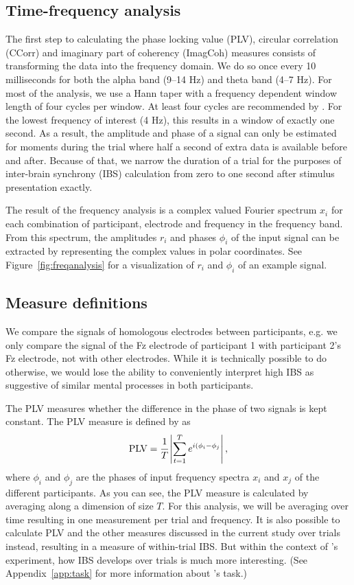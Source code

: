 \subsection{Time-frequency analysis}
The first step to calculating the phase locking value (PLV), circular
correlation (CCorr) and imaginary part of coherency (ImagCoh) measures consists
of transforming the data into the frequency domain. We do so once every 10
milliseconds for both the alpha band (9--14 Hz) and theta band (4--7 Hz). For
most of the analysis, we use a Hann taper with a frequency dependent window
length of four cycles per window. At least four cycles are recommended by
\textcite{ayrolles_hypyp_2021}. For the lowest frequency of interest (4 Hz),
this results in a window of exactly one second. As a result, the amplitude and
phase of a signal can only be estimated for moments during the trial where half
a second of extra data is available before and after. Because of that, we narrow
the duration of a trial for the purposes of inter-brain synchrony (IBS)
calculation from zero to one second after stimulus presentation exactly.

The result of the frequency analysis is a complex valued Fourier spectrum $x_i$
for each combination of participant, electrode and frequency in the frequency
band. From this spectrum, the amplitudes $r_i$ and phases $\phi_i$ of the input
signal can be extracted by representing the complex values in polar
coordinates. See Figure~\ref{fig:freqanalysis} for a visualization of $r_i$ and
$\phi_i$ of an example signal.

\subsection{Measure definitions}

We compare the signals of homologous electrodes between participants, e.g. we
only compare the signal of the Fz electrode of participant 1 with participant
2's Fz electrode, not with other electrodes. While it is technically possible
to do otherwise, we would lose the ability to conveniently interpret high IBS
as suggestive of similar mental processes in both participants.

The PLV measures whether the difference in the phase of two signals is kept
constant. The PLV measure is defined by \textcite{lachaux_measuring_1999} as
\begin{equation}\label{eq:plv}
\text{PLV} = \cfrac{1}{T}\left|\sum_{t=1}^T e^{i(\phi_i - \phi_j}\right|,
\end{equation}
where $\phi_i$ and $\phi_j$ are the phases of input frequency spectra $x_i$ and
$x_j$ of the different participants. As you can see, the PLV measure is
calculated by averaging along a dimension of size $T$. For this
analysis, we will be averaging over time resulting in one measurement per trial
and frequency. It is also possible to calculate PLV and the other measures
discussed in the current study over trials instead, resulting in a measure of
within-trial IBS. But within the context of \textcite{newman_effects_2021}'s
experiment, how IBS develops over trials is much more interesting. (See
Appendix~\ref{app:task} for more information about
\textcite{newman_effects_2021}'s task.)

